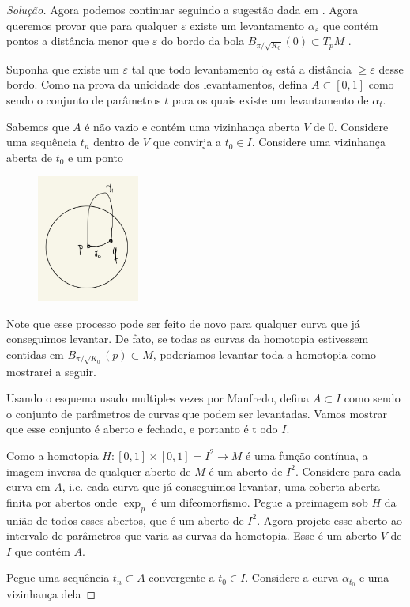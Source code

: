 \begin{proof}[Solução]
Agora podemos continuar seguindo a sugestão dada em \cite{doc}. Agora queremos provar que para qualquer \(\varepsilon\) existe um levantamento \(\alpha_\varepsilon\) que contém pontos a distância menor que \(\varepsilon\) do bordo da bola \(B_{\pi/\sqrt{K_0}}(0)\subset T_pM\) .

Suponha que existe um \(\varepsilon\) tal que todo levantamento \(\tilde{\alpha}_t\) está a distância \(\geq \varepsilon\) desse bordo. Como na prova da unicidade dos levantamentos, defina \(A \subset [0,1]\) como sendo o conjunto de parâmetros \(t\) para os quais existe um levantamento de \(\alpha_t\).

Sabemos que \(A\) é não vazio e contém uma vizinhança aberta \(V\) de 0. Considere uma sequência \(t_n\) dentro de \(V\) que convirja a \(t_0 \in I\). Considere uma vizinhança aberta de \(t_0\) e um ponto 


\begin{figure}[H]
	\centering
	\includegraphics[width=0.3\textwidth]{fig9}
\end{figure}

Note que esse processo pode ser feito de novo para qualquer curva que já conseguimos levantar. De fato, se todas as curvas da homotopia estivessem contidas em \(B_{\pi/\sqrt{K_0}}(p) \subset M\), poderíamos levantar toda a homotopia como mostrarei a seguir.

Usando o esquema usado multiples vezes por Manfredo, defina \(A \subset I\) como sendo o conjunto de parâmetros de curvas que podem ser levantadas. Vamos mostrar que esse conjunto é aberto e fechado, e portanto é t odo \(I\).

Como a homotopia \(H:[0,1]\times[0,1]=I^2 \to M\) é uma função contínua, a imagem inversa de qualquer aberto de \(M\) é um aberto de \(I^2\). Considere para cada curva em \(A\), i.e. cada curva que já conseguimos levantar, uma coberta aberta finita por abertos onde \(\operatorname{exp}_p\) é um difeomorfismo. Pegue a preimagem sob \(H\) da união de todos esses abertos, que é um aberto de \(I^2\). Agora projete esse aberto ao intervalo de parâmetros que varia as curvas da homotopia. Esse é um aberto \(V\) de \(I\) que contém \(A\).

Pegue uma sequência \(t_n \subset A\) convergente a \(t_0 \in I\). Considere a curva \(\alpha_{t_0}\) e uma vizinhança dela 



\fi

\end{proof}

